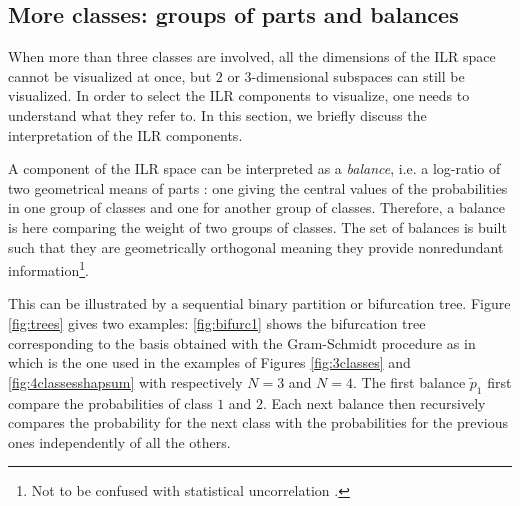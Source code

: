 \documentclass{article}
\theoremstyle{plain}
\theoremstyle{definition}
\theoremstyle{remark}
\begin{document}
\subsection{More classes: groups of parts and balances}
\label{sec:balances}

When more than three classes are involved, all the dimensions of the ILR space cannot be visualized at once, but $2$ or $3$-dimensional subspaces can still be visualized. In order to select the ILR components to visualize, one needs to understand what they refer to. In this section, we briefly discuss the interpretation of the ILR components.%

A component of the ILR space  can be interpreted as a \emph{balance}, i.e. a log-ratio of two geometrical means of parts \cite{egozcue2003isometric,egozcue2005groups,pawlowskymodeling}: one giving the central values of the probabilities in one group of classes and one for another group of classes. Therefore, a balance is here comparing the weight of two groups of classes. The set of balances is built such that they are geometrically orthogonal meaning they provide nonredundant information\footnote{Not to be confused with statistical uncorrelation \cite{pawlowskymodeling}.}.

This can be illustrated by a sequential binary partition or bifurcation tree. Figure \ref{fig:trees} gives two examples: \ref{fig:bifurc1} shows the bifurcation tree corresponding to the basis obtained with the Gram-Schmidt procedure as in \cite{egozcue2003isometric} which is the one used in the examples of Figures \ref{fig:3classes} and \ref{fig:4classesshapsum}  with respectively $N=3$ and $N=4$. The first balance $\tilde{p}_1$ first compare the probabilities of class $1$ and $2$. Each next balance then recursively compares the probability for the next class with the probabilities for the previous ones independently of all the others.
\end{document}
